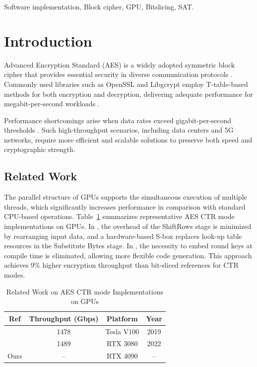 \documentclass[journal]{IEEEtran}
\begin{document}
\begin{IEEEkeywords}
   Software implementation, Block cipher, GPU, Bitslicing, SAT.
\end{IEEEkeywords}

\color{blue}
\section{Introduction}
\label{sec:intro}



 Advanced Encryption Standard (AES) is a widely adopted symmetric block cipher that provides essential security in diverse communication protocols \cite{Daemen2020}. Commonly used libraries such as OpenSSL and Libgcrypt employ T-table-based methods for both encryption and decryption, delivering adequate performance for megabit-per-second workloads \cite{Jancar2024, Marshall2021}.

Performance shortcomings arise when data rates exceed gigabit-per-second thresholds \cite{Li2020}. Such high-throughput scenarios, including data centers and 5G networks, require more efficient and scalable solutions to preserve both speed and cryptographic strength.

\subsection{Related Work}

The parallel structure of GPUs supports the simultaneous execution of multiple threads, which significantly increases performance in comparison with standard CPU-based operations. Table~\ref{tab:relared_work} summarizes representative AES CTR mode implementations on GPUs. In \cite{Hajihassani2019}, the overhead of the ShiftRows stage is minimized by rearranging input data, and a hardware-based S-box replaces look-up table resources in the Substitute Bytes stage. In \cite{Lee2022}, the necessity to embed round keys at compile time is eliminated, allowing more flexible code generation. This approach achieves 9\% higher encryption throughput than bit-sliced references for CTR modes.

\begin{table}
    \caption{Related Work on AES CTR mode Implementations on GPUs}
    \label{tab:relared_work}
    \centering
    \begin{tabular}{cccc}
        \toprule
        \textbf{Ref} & \textbf{Throughput (Gbps)} & \textbf{Platform} & \textbf{Year} \\
        \midrule
        \cite{Hajihassani2019} & 1478 & Tesla V100 & 2019 \\
        \cite{Lee2022}        & 1489 & RTX 3080   & 2022 \\
        Ours     & --   & RTX 4090         & --   \\
        \bottomrule
    \end{tabular}
\end{table}
\end{document}

